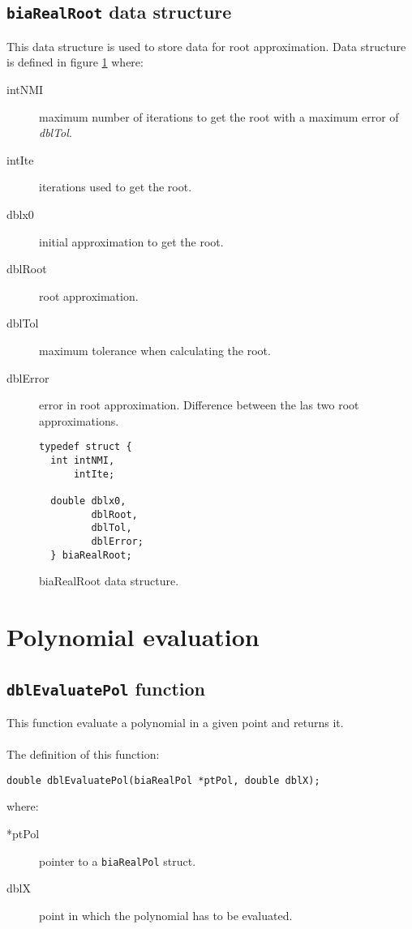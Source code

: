 \subsection{\texttt{biaRealRoot} data structure} \label{sec:biaRealRoot}

This data structure is used to store data for root approximation. Data structure is defined in figure \ref{fig:biaRealRoot} where:

\begin{description}
\item[intNMI] maximum number of iterations to get the root with a maximum error of \emph{dblTol}.
\item[intIte] iterations used to get the root.
\item[dblx0] initial approximation to get the root.
\item[dblRoot] root approximation.
\item[dblTol] maximum tolerance when calculating the root.
\item[dblError] error in root approximation. Difference between the las two root approximations.
\end{description}

\begin{figure}[!h]
\begin{verbatim}
typedef struct {
  int intNMI,
      intIte;

  double dblx0,
         dblRoot,
         dblTol,
         dblError;
  } biaRealRoot;
\end{verbatim}
\caption{biaRealRoot data structure.} \label{fig:biaRealRoot}
\end{figure}

\FloatBarrier

\section{Polynomial evaluation}

\subsection{\texttt{dblEvaluatePol} function}

This function evaluate a polynomial in a given point and returns it.\\ \\
%
The definition of this function:
%
\begin{verbatim}
double dblEvaluatePol(biaRealPol *ptPol, double dblX);  
\end{verbatim}
%
where:
\begin{description} 
\item[*ptPol] pointer to a \texttt{biaRealPol} struct.
\item[dblX] point in which the polynomial has to be evaluated.
\end{description}
%
\ \\
%
\ \\
%

